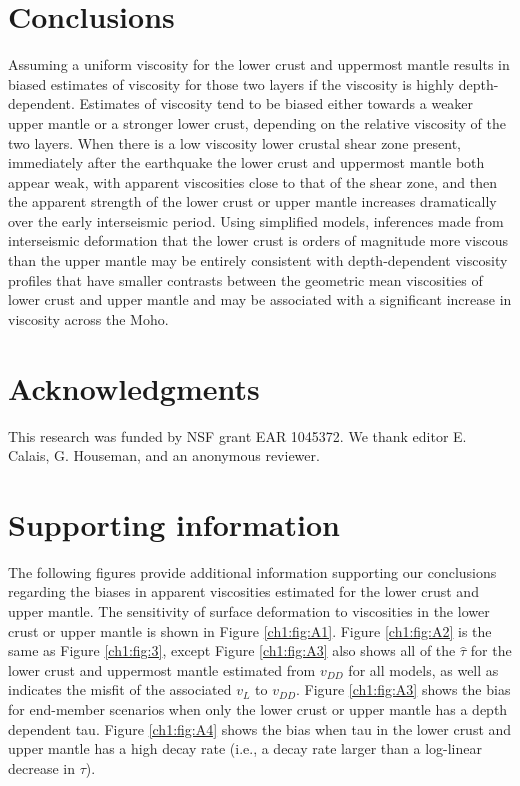 \section{Conclusions}
Assuming a uniform viscosity for the lower crust and uppermost mantle
results in biased estimates of viscosity for those two layers if the
viscosity is highly depth-dependent.  Estimates of viscosity tend to
be biased either towards a weaker upper mantle or a stronger lower
crust, depending on the relative viscosity of the two layers.  When
there is a low viscosity lower crustal shear zone present, immediately
after the earthquake the lower crust and uppermost mantle both appear
weak, with apparent viscosities close to that of the shear zone, and
then the apparent strength of the lower crust or upper mantle
increases dramatically over the early interseismic period.  Using
simplified models, inferences made from interseismic deformation that
the lower crust is orders of magnitude more viscous than the upper
mantle may be entirely consistent with depth-dependent viscosity
profiles that have smaller contrasts between the geometric mean
viscosities of lower crust and upper mantle and may be associated with
a significant increase in viscosity across the Moho.

\section{Acknowledgments}
This research was funded by NSF grant EAR 1045372. We thank editor E.
Calais, G. Houseman, and an anonymous reviewer.




\section{Supporting information}
The following figures provide additional information supporting our
conclusions regarding the biases in apparent viscosities estimated for
the lower crust and upper mantle. The sensitivity of surface
deformation to viscosities in the lower crust or upper mantle is shown
in Figure \ref{ch1:fig:A1}.  Figure \ref{ch1:fig:A2} is the same as
Figure \ref{ch1:fig:3}, except Figure \ref{ch1:fig:A3} also shows all
of the $\hat{\tau}$ for the lower crust and uppermost mantle estimated
from $v_{DD}$ for all models, as well as indicates the misfit of the
associated $v_L$ to $v_{DD}$. Figure \ref{ch1:fig:A3} shows the bias
for end-member scenarios when only the lower crust or upper mantle has
a depth dependent tau. Figure \ref{ch1:fig:A4} shows the bias when tau
in the lower crust and upper mantle has a high decay rate (i.e., a
decay rate larger than a log-linear decrease in $\tau$).

